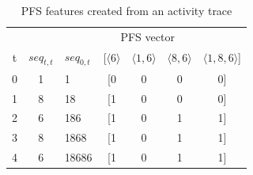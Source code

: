 \begin{table}
    \centering
    \begin{adjustbox}{center}
    \begin{tabular}{cclcccc}
          &      &              & \multicolumn{3}{c}{PFS vector}\\
 t & $seq_{t, t}$ & $seq_{0,t}$ & [$\langle 6\rangle$ & $\langle 1,6\rangle$ & $\langle 8,6\rangle$ & $\langle1,8,6\rangle$]\\
        \midrule
        0 & 1    & 1            & [0 & 0 & 0 & 0]\\
        1 & 8    & 18           & [1 & 0 & 0 & 0]\\
        2 & 6    & 186          & [1 & 0 & 1 & 1]\\
        3 & 8    & 1868         & [1 & 0 & 1 & 1]\\
        4 & 6    & 18686        & [1 & 0 & 1 & 1]\\
    \end{tabular}
    \end{adjustbox}
    \caption{PFS features created from an activity trace}
    \label{tab:pfs-activity-trace}
\end{table}
